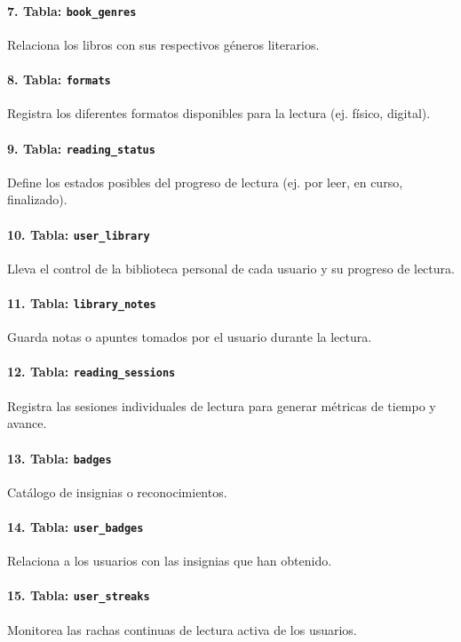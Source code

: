 \documentclass[12pt, atypical, journal]{article}
\begin{document}
\paragraph{7. Tabla: \texttt{book\_genres}}
Relaciona los libros con sus respectivos géneros literarios.

\paragraph{8. Tabla: \texttt{formats}}
Registra los diferentes formatos disponibles para la lectura (ej. físico, digital).


\paragraph{9. Tabla: \texttt{reading\_status}}
Define los estados posibles del progreso de lectura (ej. por leer, en curso, finalizado).

\paragraph{10. Tabla: \texttt{user\_library}}
Lleva el control de la biblioteca personal de cada usuario y su progreso de lectura.

\paragraph{11. Tabla: \texttt{library\_notes}}
Guarda notas o apuntes tomados por el usuario durante la lectura.

\paragraph{12. Tabla: \texttt{reading\_sessions}}
Registra las sesiones individuales de lectura para generar métricas de tiempo y avance.

\paragraph{13. Tabla: \texttt{badges}}
Catálogo de insignias o reconocimientos.

\paragraph{14. Tabla: \texttt{user\_badges}}
Relaciona a los usuarios con las insignias que han obtenido.

\paragraph{15. Tabla: \texttt{user\_streaks}}
Monitorea las rachas continuas de lectura activa de los usuarios.
\end{document}
